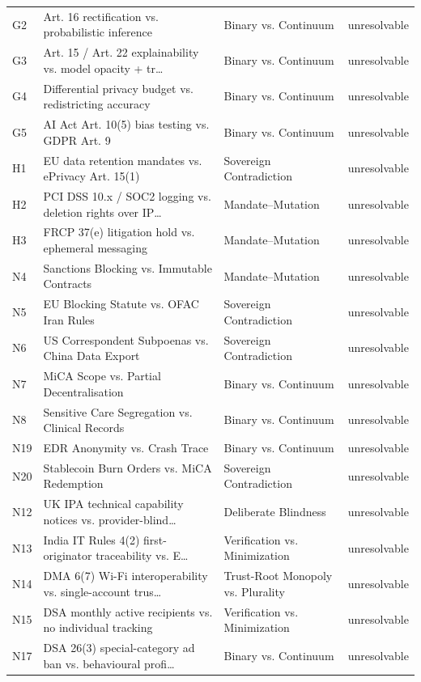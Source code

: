 \begin{table}[t]
\begin{tabular}{llll}
  G2 & Art. 16 rectification vs. probabilistic inference & Binary vs. Continuum & unresolvable \\
  G3 & Art. 15 / Art. 22 explainability vs. model opacity + tr… & Binary vs. Continuum & unresolvable \\
  G4 & Differential privacy budget vs. redistricting accuracy & Binary vs. Continuum & unresolvable \\
  G5 & AI Act Art. 10(5) bias testing vs. GDPR Art. 9 & Binary vs. Continuum & unresolvable \\
  H1 & EU data retention mandates vs. ePrivacy Art. 15(1) & Sovereign Contradiction & unresolvable \\
  H2 & PCI DSS 10.x / SOC2 logging vs. deletion rights over IP… & Mandate--Mutation & unresolvable \\
  H3 & FRCP 37(e) litigation hold vs. ephemeral messaging & Mandate--Mutation & unresolvable \\
  N4 & Sanctions Blocking vs. Immutable Contracts & Mandate--Mutation & unresolvable \\
  N5 & EU Blocking Statute vs. OFAC Iran Rules & Sovereign Contradiction & unresolvable \\
  N6 & US Correspondent Subpoenas vs. China Data Export & Sovereign Contradiction & unresolvable \\
  N7 & MiCA Scope vs. Partial Decentralisation & Binary vs. Continuum & unresolvable \\
  N8 & Sensitive Care Segregation vs. Clinical Records & Binary vs. Continuum & unresolvable \\
  N19 & EDR Anonymity vs. Crash Trace & Binary vs. Continuum & unresolvable \\
  N20 & Stablecoin Burn Orders vs. MiCA Redemption & Sovereign Contradiction & unresolvable \\
  N12 & UK IPA technical capability notices vs. provider-blind… & Deliberate Blindness & unresolvable \\
  N13 & India IT Rules 4(2) first-originator traceability vs. E… & Verification vs. Minimization & unresolvable \\
  N14 & DMA 6(7) Wi-Fi interoperability vs. single-account trus… & Trust-Root Monopoly vs. Plurality & unresolvable \\
  N15 & DSA monthly active recipients vs. no individual tracking & Verification vs. Minimization & unresolvable \\
  N17 & DSA 26(3) special-category ad ban vs. behavioural profi… & Binary vs. Continuum & unresolvable \\

\end{tabular}
\end{table}
